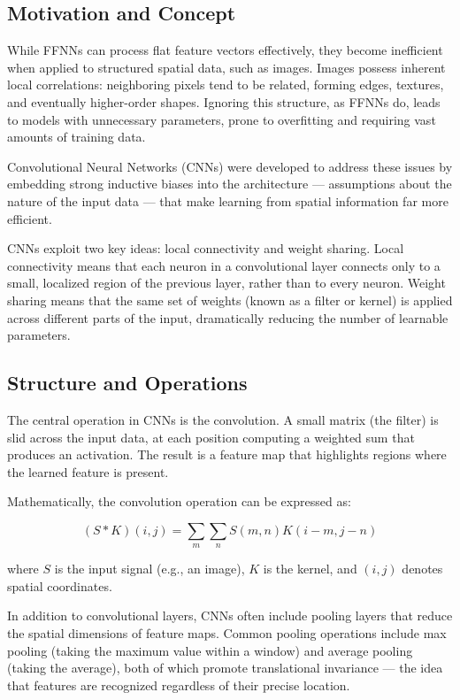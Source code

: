 \documentclass{book}
\begin{document}
\subsection{Motivation and Concept}

While FFNNs can process flat feature vectors effectively, they become 
inefficient when applied to structured spatial data, such as images. Images 
possess inherent local correlations: neighboring pixels tend to be related, 
forming edges, textures, and eventually higher-order shapes. Ignoring this 
structure, as FFNNs do, leads to models with unnecessary parameters, prone to 
overfitting and requiring vast amounts of training data.

Convolutional Neural Networks (CNNs) were developed to address these issues by 
embedding strong inductive biases into the architecture — assumptions about the 
nature of the input data — that make learning from spatial information far more 
efficient.

CNNs exploit two key ideas: local connectivity and weight sharing. Local 
connectivity means that each neuron in a convolutional layer connects only to a 
small, localized region of the previous layer, rather than to every neuron. 
Weight sharing means that the same set of weights (known as a filter or kernel) 
is applied across different parts of the input, dramatically reducing the number 
of learnable parameters.

\subsection{Structure and Operations}

The central operation in CNNs is the convolution. A small matrix (the filter) is 
slid across the input data, at each position computing a weighted sum that 
produces an activation. The result is a feature map that highlights regions 
where the learned feature is present.

Mathematically, the convolution operation can be expressed as:

\begin{equation}
(S \ast K)(i,j) = \sum_{m} \sum_{n} S(m,n)K(i - m,j - n)
\end{equation}

where $S$ is the input signal (e.g., an image), $K$ is the kernel, and $(i,j)$ 
denotes spatial coordinates.

In addition to convolutional layers, CNNs often include pooling layers that 
reduce the spatial dimensions of feature maps. Common pooling operations include 
max pooling (taking the maximum value within a window) and average pooling 
(taking the average), both of which promote translational invariance — the idea 
that features are recognized regardless of their precise location.
\end{document}
